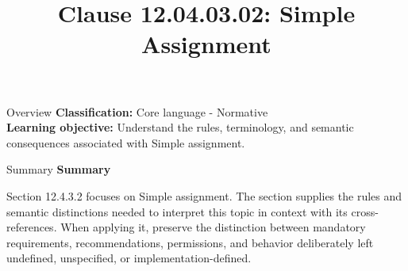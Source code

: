 \documentclass[10pt,letterpaper]{article}
\title{Clause 12.04.03.02: Simple Assignment}
\author{}
\date{}
\begin{document}
\maketitle
\begin{CornellOverviewBox}{Overview}
\textbf{Classification:} Core language - Normative\\[2pt]
\textbf{Learning objective:} Understand the rules, terminology, and semantic consequences associated with Simple assignment.
\end{CornellOverviewBox}\begin{CornellSummaryBox}{Summary}
{\sffamily\bfseries\color{Accent} Summary}\par\vspace{3pt}Section 12.4.3.2 focuses on Simple assignment. The section supplies the rules and semantic distinctions needed to interpret this topic in context with its cross-references. When applying it, preserve the distinction between mandatory requirements, recommendations, permissions, and behavior deliberately left undefined, unspecified, or implementation-defined.
\end{CornellSummaryBox}
\end{document}
